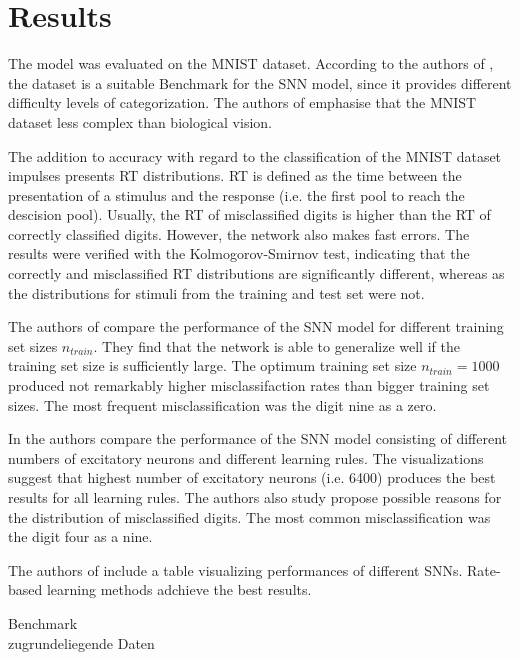 \section{Results}
\label{sec:result}
The model was evaluated on the MNIST dataset.
According to the authors of \cite{STDP_like}, the dataset is a suitable Benchmark for the \ac{SNN} model, 
since it provides different difficulty levels of categorization.
The authors of \cite{STDP_like} emphasise that the MNIST dataset less complex than biological vision.

The addition to accuracy with regard to the classification of the MNIST dataset impulses \cite{STDP_like} presents \ac{RT} distributions.
\ac{RT} is defined as the time between the presentation of a stimulus and the response (i.e. the first pool to reach the descision pool).
Usually, the \ac{RT} of misclassified digits is higher than the \ac{RT} of correctly classified digits.
However, the network also makes fast errors.
The results were verified with the Kolmogorov-Smirnov test, 
indicating that the correctly and misclassified \ac{RT} distributions are significantly different, 
whereas as the distributions for stimuli from the training and test set were not.

The authors of \cite{STDP_like} compare the performance of the \ac{SNN} model for different training set sizes $n_{train}$.
They find that the network is able to generalize well if the training set size is sufficiently large.
The optimum training set size $n_{train} = 1000$ produced not remarkably higher misclassifaction rates than bigger training set sizes.
The most frequent misclassification was the digit nine as a zero.


In \cite{SNN} the authors compare the performance of the \ac{SNN} model consisting of different numbers of excitatory neurons and different learning rules.
The visualizations suggest that highest number of excitatory neurons (i.e. 6400) produces the best results for all learning rules.
The authors also study propose possible reasons for the distribution of misclassified digits.
The most common misclassification was the digit four as a nine.

The authors of \cite{SNN} include a table visualizing performances of different \acp{SNN}.
Rate-based learning methods adchieve the best results.


Benchmark\\
zugrundeliegende Daten